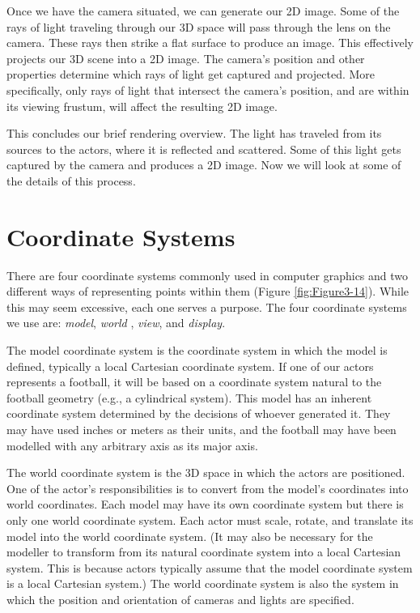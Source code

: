 Once we have the camera situated, we can generate our 2D image. Some of the rays of light traveling through our 3D space will pass through the lens on the camera. These rays then strike a flat surface to produce an image. This effectively projects our 3D scene into a 2D image. The camera’s position and other properties determine which rays of light get captured and projected. More specifically, only rays of light that intersect the camera’s position, and are within its viewing frustum, will affect the resulting 2D image.

This concludes our brief rendering overview. The light has traveled from its sources to the actors, where it is reflected and scattered. Some of this light gets captured by the camera and produces a 2D image. Now we will look at some of the details of this process.

\section{Coordinate Systems}
\label{sec:coordinate_systems}

There are four coordinate systems commonly used in computer graphics and two different ways of representing points within them (Figure \ref{fig:Figure3-14}). While this may seem excessive, each one serves a purpose. The four coordinate systems we use are: \emph{model}, \emph{world} , \emph{view}, and \emph{display}.

The model coordinate system is the coordinate system in which the model is defined, typically a local Cartesian coordinate system. If one of our actors represents a football, it will be based on a coordinate system natural to the football geometry (e.g., a cylindrical system). This model has an inherent coordinate system determined by the decisions of whoever generated it. They may have used inches or meters as their units, and the football may have been modelled with any arbitrary axis as its major axis.

The world coordinate system is the 3D space in which the actors are positioned. One of the actor’s responsibilities is to convert from the model’s coordinates into world coordinates. Each model may have its own coordinate system but there is only one world coordinate system. Each actor must scale, rotate, and translate its model into the world coordinate system. (It may also be necessary for the modeller to transform from its natural coordinate system into a local Cartesian system. This is because actors typically assume that the model coordinate system is a local Cartesian system.) The world coordinate system is also the system in which the position and orientation of cameras and lights are specified.

